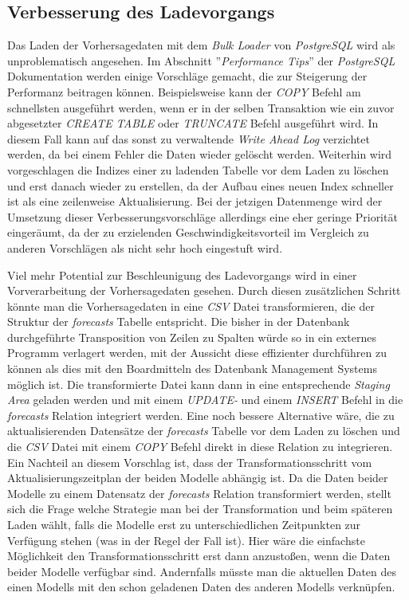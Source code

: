 \subsection{Verbesserung des Ladevorgangs}
Das Laden der Vorhersagedaten mit dem \textit{Bulk Loader} von
\textit{PostgreSQL} wird als unproblematisch angesehen. Im Abschnitt
''\textit{Performance Tips}'' \cite{postgresql:performance} der
\textit{PostgreSQL} Dokumentation werden einige Vorschläge gemacht,
die zur Steigerung der Performanz beitragen können. Beispielsweise
kann der \textit{COPY} Befehl am schnellsten ausgeführt werden, wenn
er in der selben Transaktion wie ein zuvor abgesetzter \textit{CREATE
  TABLE} oder \textit{TRUNCATE} Befehl ausgeführt wird. In diesem Fall
kann auf das sonst zu verwaltende \textit{Write Ahead Log} verzichtet
werden, da bei einem Fehler die Daten wieder gelöscht
werden. Weiterhin wird vorgeschlagen die Indizes einer zu ladenden
Tabelle vor dem Laden zu löschen und erst danach wieder zu erstellen,
da der Aufbau eines neuen Index schneller ist als eine zeilenweise
Aktualisierung. Bei der jetzigen Datenmenge wird der Umsetzung dieser
Verbesserungsvorschläge allerdings eine eher geringe Priorität
eingeräumt, da der zu erzielenden Geschwindigkeitsvorteil im Vergleich
zu anderen Vorschlägen als nicht sehr hoch eingestuft wird.

Viel mehr Potential zur Beschleunigung des Ladevorgangs wird in einer
Vorverarbeitung der Vorhersagedaten gesehen. Durch diesen zusätzlichen
Schritt könnte man die Vorhersagedaten in eine \textit{CSV} Datei
transformieren, die der Struktur der \textit{forecasts} Tabelle
entspricht. Die bisher in der Datenbank durchgeführte Transposition
von Zeilen zu Spalten würde so in ein externes Programm verlagert
werden, mit der Aussicht diese effizienter durchführen zu können als
dies mit den Boardmitteln des Datenbank Management Systems möglich
ist. Die transformierte Datei kann dann in eine entsprechende
\textit{Staging Area} geladen werden und mit einem \textit{UPDATE-}
und einem \textit{INSERT} Befehl in die \textit{forecasts} Relation
integriert werden. Eine noch bessere Alternative wäre, die zu
aktualisierenden Datensätze der \textit{forecasts} Tabelle vor dem
Laden zu löschen und die \textit{CSV} Datei mit einem \textit{COPY}
Befehl direkt in diese Relation zu integrieren. Ein Nachteil an diesem
Vorschlag ist, dass der Transformationsschritt vom
Aktualisierungszeitplan der beiden Modelle abhängig ist. Da die Daten
beider Modelle zu einem Datensatz der \textit{forecasts} Relation
transformiert werden, stellt sich die Frage welche Strategie man bei
der Transformation und beim späteren Laden wählt, falls die Modelle
erst zu unterschiedlichen Zeitpunkten zur Verfügung stehen (was in der
Regel der Fall ist). Hier wäre die einfachste Möglichkeit den
Transformationsschritt erst dann anzustoßen, wenn die Daten beider
Modelle verfügbar sind. Andernfalls müsste man die aktuellen Daten des
einen Modells mit den schon geladenen Daten des anderen Modells
verknüpfen.

